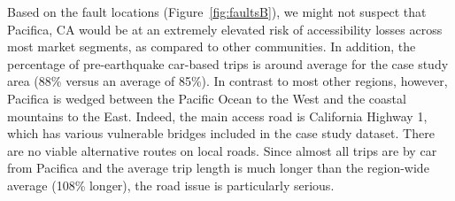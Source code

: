 

Based on the fault locations (Figure~\ref{fig:faultsB}), we might not suspect that Pacifica, CA would be at an extremely elevated risk of accessibility losses across most market segments, as compared to other communities. In addition, the percentage of pre-earthquake car-based trips is around average for the case study area (88\% versus an average of 85\%). 
In contrast to most other regions, however, Pacifica is wedged between the Pacific Ocean to the West and the coastal mountains to the East. Indeed, the main access road is California Highway 1, which has various vulnerable bridges included in the case study dataset. There are no viable alternative routes on local roads. Since almost all trips are by car from Pacifica and the average trip length is much longer than the region-wide average (108\% longer), the road issue is particularly serious.

